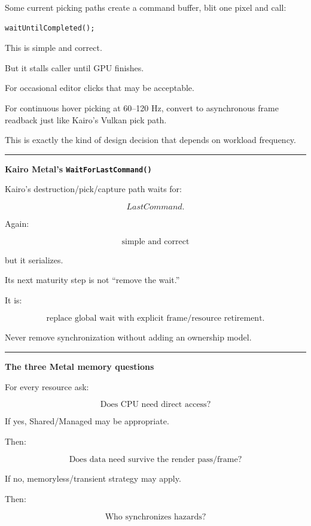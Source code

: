 Some current picking paths create a command buffer, blit one pixel and call:

\begin{verbatim}
waitUntilCompleted();
\end{verbatim}

This is simple and correct.

But it stalls caller until GPU finishes.

For occasional editor clicks that may be acceptable.

For continuous hover picking at 60--120 Hz, convert to asynchronous frame readback just like Kairo's Vulkan pick path.

This is exactly the kind of design decision that depends on workload frequency.

\begin{center}\rule{0.5\linewidth}{0.5pt}\end{center}

\textbf{Kairo Metal's \texttt{WaitForLastCommand()}}

Kairo's destruction/pick/capture path waits for:

\[
LastCommand.
\]

Again:

\[
\boxed{
\text{simple and correct}
}
\]

but it serializes.

Its next maturity step is not ``remove the wait.''

It is:

\[
\boxed{
\text{replace global wait with explicit frame/resource retirement}.
}
\]

Never remove synchronization without adding an ownership model.

\begin{center}\rule{0.5\linewidth}{0.5pt}\end{center}

\textbf{The three Metal memory questions}

For every resource ask:

\[
\boxed{
\text{Does CPU need direct access?}
}
\]

If yes, Shared/Managed may be appropriate.

Then:

\[
\boxed{
\text{Does data need survive the render pass/frame?}
}
\]

If no, memoryless/transient strategy may apply.

Then:

\[
\boxed{
\text{Who synchronizes hazards?}
}
\]

